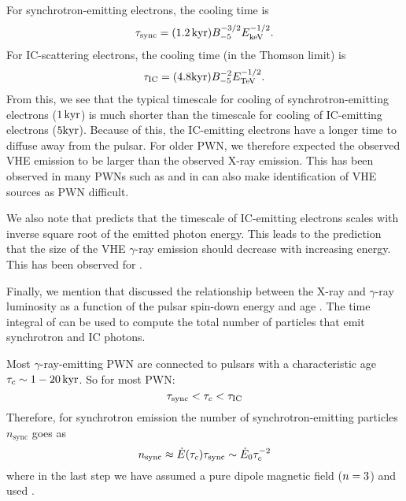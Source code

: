 For synchrotron-emitting electrons, the cooling time is
\begin{equation}
  \tau_\text{sync} = (1.2\,\text{k}\text{yr}) B_{-5}^{-3/2} E_\text{keV}^{-1/2}.
\end{equation}
For \ac{IC}-scattering electrons, the cooling time (in the Thomson
limit) is
\begin{equation}
  \eqnlabel{ic_timescale}
  \lifetime_\text{IC} = (4.8\kyr) B_{-5}^{-2} \energy_\tev^{-1/2}.
\end{equation}
From this, we see that the typical timescale for cooling of
synchrotron-emitting electrons ($1\,\text{k}\text{yr}$) is much shorter
than the timescale for cooling of \ac{IC}-emitting electrons
($5\text{k}\text{yr}$). Because of this, the \ac{IC}-emitting electrons have a
longer time to diffuse away from the pulsar.  For older \ac{PWN}, we
therefore expected the observed \ac{VHE} emission to be larger than
the observed X-ray emission.  This has been observed in many \acp{PWN}
such as  \citep{aharonian_2006a_h.e.s.s.-survey} and in can
also make identification of \ac{VHE} sources as \ac{PWN} difficult.

We also note that  predicts that the timescale
of \ac{IC}-emitting electrons scales with inverse square root of
the emitted photon energy. This leads to the prediction that
the size of the \ac{VHE} $\gamma$-ray emission should decrease
with increasing energy. This has been observed for 
\citep{aharonian_2006a_energy-dependent}.

Finally, we mention that \cite{mattana_2009_evolution-gamma-} discussed
the relationship between the X-ray and $\gamma$-ray luminosity as a
function of the pulsar spin-down energy \energydot and age \PulsarAge.
The time integral of  can be used to compute
the total number of particles that emit synchrotron and \ac{IC} photons.

Most $\gamma$-ray-emitting \ac{PWN} are connected to pulsars with a
characteristic age $\tau_c\sim1-20\,\text{k}\text{yr}$. So for most
\ac{PWN}:
\begin{equation}
  \tau_\text{sync} < \tau_c < \tau_\text{IC}
\end{equation}
Therefore, for synchrotron emission the number of synchrotron-emitting
particles $n_\text{sync}$ goes as
\begin{equation}
  n_\text{sync} \approx \dot{E}(\tau_c) \tau_\text{sync} \sim \dot{E}_0 \tau_c^{-2}
\end{equation}
where in the last step we have assumed a pure dipole magnetic field
($n=3$) and used .

